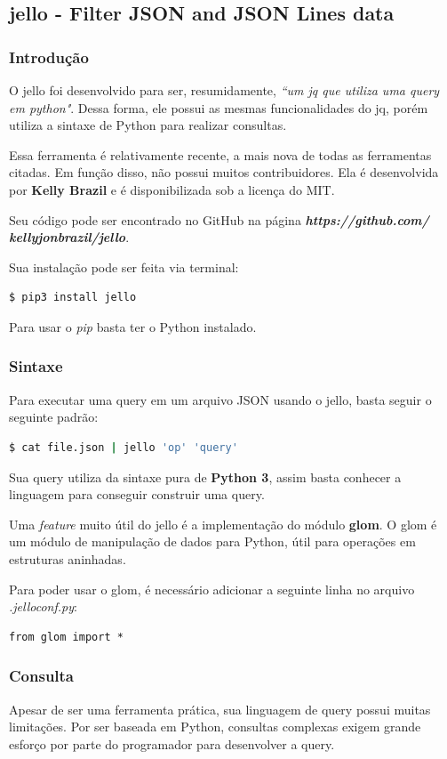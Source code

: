 \documentclass[a4paper, 12pt] {article}
\begin{document}
		\subsection{jello - Filter JSON and JSON Lines data}
			\subsubsection{Introdução}
				O jello foi desenvolvido para ser, resumidamente, \textit{“um jq que utiliza uma query em python"}. Dessa forma, ele possui as mesmas funcionalidades do jq, porém utiliza a sintaxe de Python para realizar consultas.

				Essa ferramenta é relativamente recente, a mais nova de todas as ferramentas citadas. Em função disso, não possui muitos contribuidores. Ela é desenvolvida por \textbf{Kelly Brazil} e é disponibilizada sob a licença do MIT.

				Seu código pode ser encontrado no GitHub na página \textit{\textbf{https://github.com/\\kellyjonbrazil/jello}}.

				Sua instalação pode ser feita via terminal:
\begin{lstlisting}[language=bash]
$ pip3 install jello
\end{lstlisting}

				Para usar o \textit{pip} basta ter o Python instalado.
			\subsubsection{Sintaxe}
				Para executar uma query em um arquivo JSON usando o jello, basta seguir o seguinte padrão:
\begin{lstlisting}[language=bash]
$ cat file.json | jello 'op' 'query'
\end{lstlisting}

				Sua query utiliza da sintaxe pura de \textbf{Python 3}, assim basta conhecer a linguagem para conseguir construir uma query.

				Uma \textit{feature} muito útil do jello é a implementação do módulo \textbf{glom}. O glom é um módulo de manipulação de dados para Python, útil para operações em estruturas aninhadas.

				Para poder usar o glom, é necessário adicionar a seguinte linha no arquivo \textit{.jelloconf.py}:
\begin{lstlisting}
from glom import *
\end{lstlisting}
			\subsubsection{Consulta}
				Apesar de ser uma ferramenta prática, sua linguagem de query possui muitas limitações. Por ser baseada em Python, consultas complexas exigem grande esforço por parte do programador para desenvolver a query.
\end{document}
